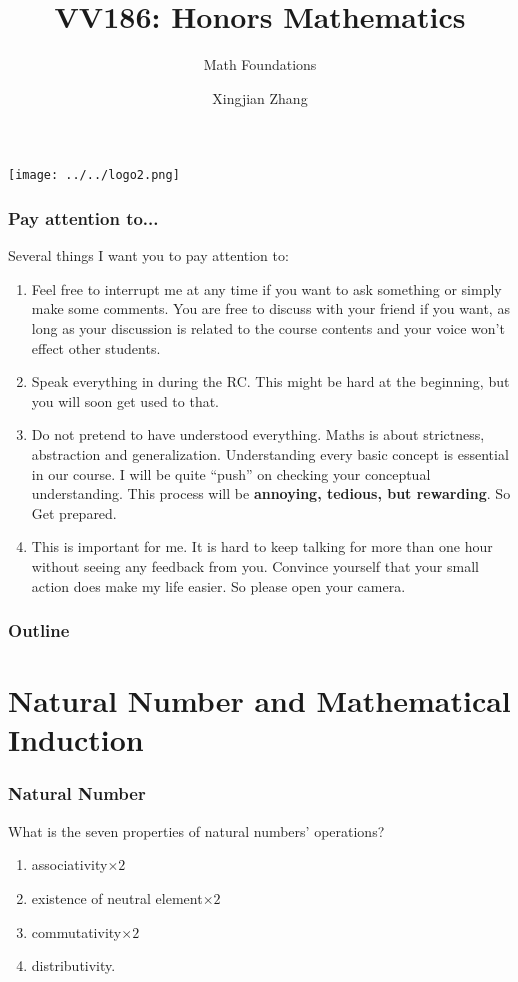 \documentclass[10pt, t]{beamer}
\title{VV186: Honors Mathematics}
\subtitle{\large Math Foundations}
\institute[UM-SJTU JI]{Univerity of Michigan-Shanghai Jiao Tong University Joint Institute}
\author{Xingjian Zhang}
\newcommand{\alarm}[1]{{\color{bladerunnerred}{#1}}}
\newcommand{\nullspace}{~\\[15pt]}
\begin{document}
\begin{frame}
    \titlepage
    \begin{center}
        \texttt{[image: ../../logo2.png]}
    \end{center}
\end{frame}

\begin{frame}
    \frametitle{Pay attention to...}
    Several things I want you to pay attention to:
    \begin{enumerate}
        \item \alarm{Be interactive.} Feel free to interrupt me at any time if you want to ask something or simply make some comments. You are free to discuss with your friend if you want, as long as your discussion is related to the course contents and your voice won't effect other students.
        \item Speak everything in \alarm{English} during the RC. This might be hard at the beginning, but you will soon get used to that.
        \item \alarm{``Question everything.''} Do not pretend to have understood everything. Maths is about strictness, abstraction and generalization. Understanding every basic concept is essential in our course. I will be quite ``push'' on checking your conceptual understanding. This process will be \textbf{annoying, tedious, but rewarding}. So Get prepared.
        \item \alarm{Open the camera if you can.} This is important for me. It is hard to keep talking for more than one hour without seeing any feedback from you. Convince yourself that your small action does make my life easier. So please open your camera.
    \end{enumerate}
\end{frame}

\begin{frame}
    \frametitle{Outline}
    \begin{spacing}{1}
        \tableofcontents
    \end{spacing}
\end{frame}

\section{Natural Number and Mathematical Induction}
\begin{frame}
    \frametitle{Natural Number}
    What is the seven properties of natural numbers' operations?\nullspace
    \pause
    \begin{enumerate}
        \item
              associativity$\times 2$
        \item
              existence of neutral element$\times 2$
        \item commutativity$\times 2$
        \item distributivity.
    \end{enumerate}
\end{frame}
\end{document}
